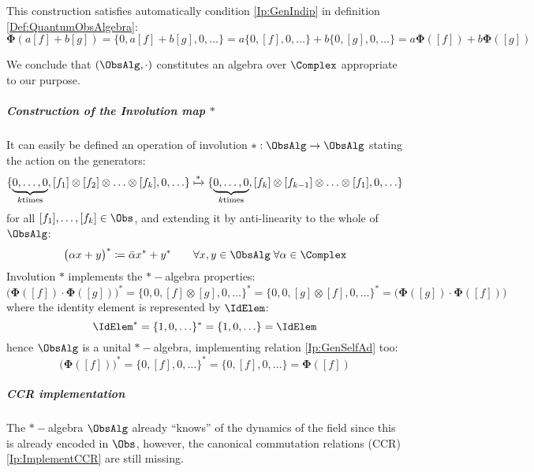 \documentclass[Main]{subfiles}
\begin{document}
				This construction satisfies automatically condition \ref{Ip:GenIndip} in definition \ref{Def:QuantumObsAlgebra}:
						\begin{displaymath}
							\mathbf{\Phi}(a[f] + b[g]) = \big\{0, a[f] + b[g],0, \ldots \big\}= a\{0, [f],0,\ldots\} + b\{0, [g],0,\ldots \} = a \mathbf{\Phi}([f]) + b \mathbf{\Phi}([g])
						\end{displaymath}

				We conclude that  $(\ObsAlg, \cdot )$ constitutes an algebra over $\Complex$ appropriate to our purpose.

   			\subparagraph{Construction of the Involution map $*$}
	   			It can easily be defined an operation of involution $*:\ObsAlg \rightarrow \ObsAlg$ stating the action on the generators:
				\begin{displaymath}
					\{ \underbrace{0,\ldots, 0}_{k \textrm{times}}, [f_1]\otimes [f_2] \otimes \ldots \otimes [f_k],0,\ldots \}
					\xmapsto{*}
					\{ \underbrace{0,\ldots, 0}_{k \textrm{times}}, [f_k]\otimes [f_{k-1}] \otimes \ldots \otimes [f_1],0,\ldots \}
				\end{displaymath}
				for all $[f_1],\ldots,[f_k] \in \Obs$, and extending it by anti-linearity to the whole of $\ObsAlg$:
				\begin{displaymath}
					\big( \alpha x + y \big)^* \coloneqq \bar{\alpha} x^* + y^* \qquad \forall x,y\in \ObsAlg \; \forall \alpha \in \Complex
				\end{displaymath}
				Involution $*$ implements the $\ast-$algebra properties:
				\begin{equation}
					\big( \mathbf{\Phi}([f]) \cdot \mathbf{\Phi}([g]) \big)^* = \big\{0,0,[f]\otimes [g],0,\ldots \big\}^* =
					\big\{0,0,[g]\otimes [f],0,\ldots \big\}^* = \big( \mathbf{\Phi}([g]) \cdot \mathbf{\Phi}([f]) \big)
				\end{equation}
				where the identity element is represented by $\IdElem$:
				\begin{equation}
				\IdElem^* = \{1,0,\ldots\}^* =\{1,0,\ldots\}= \IdElem
				\end{equation}
				hence $\ObsAlg$ is a unital $\ast-$algebra, implementing relation \ref{Ip:GenSelfAd} too:
				\begin{displaymath}
					\big(\mathbf{\Phi}([f])\big)^* = \big\{ 0, [f],0,\ldots\big\}^* = \big\{ 0, [f],0,\ldots\big\} = \mathbf{\Phi}([f])
				\end{displaymath}
   			\subparagraph{CCR implementation}
				The $\ast-$algebra $\ObsAlg$ already “knows” of the dynamics of the field since this is already encoded in $\Obs$, however, the canonical commutation relations (CCR) \ref{Ip:ImplementCCR} are still missing.
\end{document}
